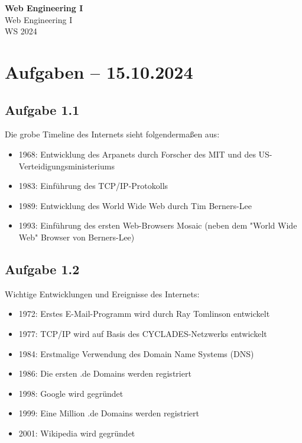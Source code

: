 \documentclass[11pt]{article}
\begin{document}
\thispagestyle{empty}

\newtheorem{definition}{Definition}[section]
\newtheorem{anmk}{Anmerkung}[section]
\newtheorem{bsp}{Beispiel}[section]
\newtheorem{aufgabe}{Aufgabe}[section]

\newcommand{\N}{\mathbb{N}}
\newcommand{\Z}{\mathbb{Z}}
\newcommand{\R}{\mathbb{R}}

\begin{center}
  {\LARGE \bf Web Engineering I}\\
  {\Large Web Engineering I}\\
  WS 2024
\end{center}

\section{Aufgaben -- 15.10.2024}
\subsection{Aufgabe 1.1}
Die grobe Timeline des Internets sieht folgendermaßen aus:
\begin{itemize}
  \item 1968: Entwicklung des Arpanets durch Forscher des MIT und des US-Verteidigungsministeriums
  \item 1983: Einführung des TCP/IP-Protokolls
  \item 1989: Entwicklung des World Wide Web durch Tim Berners-Lee
  \item 1993: Einführung des ersten Web-Browsers Mosaic (neben dem "World Wide Web" Browser von Berners-Lee)
\end{itemize}

\subsection{Aufgabe 1.2}
Wichtige Entwicklungen und Ereignisse des Internets:
\begin{itemize}
  \item 1972: Erstes E-Mail-Programm wird durch Ray Tomlinson entwickelt
  \item 1977: TCP/IP wird auf Basis des CYCLADES-Netzwerks entwickelt
  \item 1984: Erstmalige Verwendung des Domain Name Systems (DNS)
  \item 1986: Die ersten .de Domains werden registriert
  \item 1998: Google wird gegründet
  \item 1999: Eine Million .de Domains werden registriert
  \item 2001: Wikipedia wird gegründet
\end{itemize}
\end{document}
